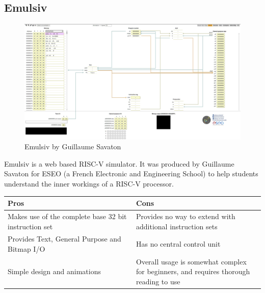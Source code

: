 \subsection{Emulsiv}\label{sec:emulsiv}
\begin{figure}[H]
    \centering
    \includegraphics[width=0.85\linewidth]{dissertation/DATA/EMULSIV.jpg}
    \caption{Emulsiv by Guillaume Savaton}
    \label{fig:emulsiv}
\end{figure}
Emulsiv \cite{savaton_2023_eseotechemulsiv} is a web based RISC-V simulator. It was produced by Guillaume Savaton for ESEO (a French Electronic and Engineering School) to help students understand the inner workings of a RISC-V processor. 

\begin{table}[h]
\begin{tabular}{|p{0.5\linewidth} | p{0.5\linewidth}|}
\hline
\textbf{Pros}                                         & \textbf{Cons}                                                                         \\ \hline
Makes use of the complete base 32 bit instruction set & Provides no way to extend with additional instruction sets                            \\ \hline
Provides Text, General Purpose and Bitmap I/O         & Has no central control unit                                                           \\ \hline
Simple design and animations                          & Overall usage is somewhat complex for beginners, and requires thorough reading to use \\ \hline
\end{tabular}
\end{table}

